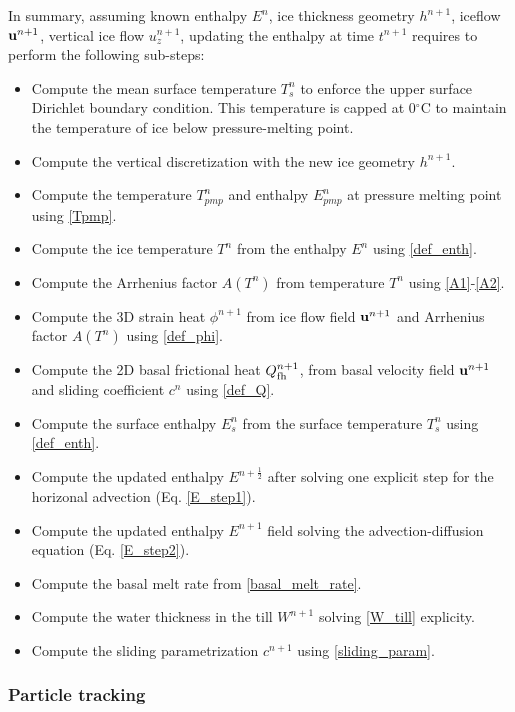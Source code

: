 \documentclass[gmd]{copernicus}
\begin{document}
In summary, assuming known enthalpy $E^n$, ice thickness geometry $h^{n+1}$, iceflow ${\bf u}^{n+1}$, vertical ice flow $u^{n+1}_z$, updating the enthalpy at time $t^{n+1}$ requires to perform the following sub-steps:
\begin{itemize}
\item Compute the mean surface temperature $T^n_s$ to enforce the upper surface Dirichlet boundary condition. This temperature is capped at 0$^{\circ}$C to maintain the temperature of ice below pressure-melting point.
\item Compute the vertical discretization with the new ice geometry $h^{n+1}$.
\item Compute the temperature $T_{pmp}^n$ and enthalpy $E_{pmp}^n$ at pressure melting point using \eqref{Tpmp}.
\item Compute the ice temperature $T^n$ from the enthalpy $E^n$ using \eqref{def_enth}.
\item Compute the Arrhenius factor $A(T^n)$ from temperature $T^n$ using \eqref{A1}-\eqref{A2}.
\item Compute the 3D strain heat $\phi^{n+1}$ from ice flow field ${\bf u}^{n+1}$ and Arrhenius factor $A(T^n)$ using \eqref{def_phi}.
\item Compute the 2D basal frictional heat $Q_{\rm fh}^{n+1}$, from basal velocity field ${\bf u}^{n+1}$ and sliding coefficient $c^n$ using \eqref{def_Q}.
\item Compute the surface enthalpy $E^n_s$ from the surface temperature $T^n_s$  using \eqref{def_enth}.
\item Compute the updated enthalpy $E^{n+\frac12}$ after solving one explicit step for the horizonal advection (Eq. \eqref{E_step1}).
\item Compute the updated enthalpy $E^{n+1}$ field solving the advection-diffusion equation (Eq. \eqref{E_step2}).
\item Compute the basal melt rate from \eqref{basal_melt_rate}.
\item Compute the water thickness in the till $W^{n+1}$ solving \eqref{W_till} explicity.
\item Compute the sliding parametrization $c^{n+1}$ using \eqref{sliding_param}.
\end{itemize}

\subsubsection{Particle tracking}
\label{num_particle_tracking}
\end{document}
